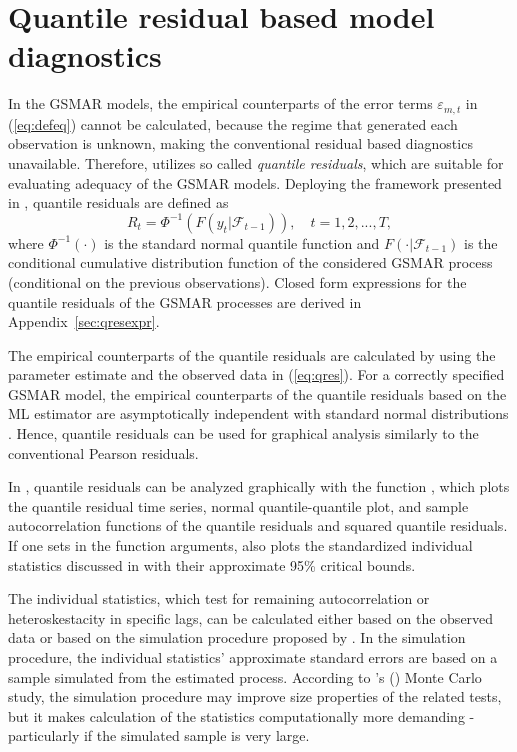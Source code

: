 \documentclass[nojss]{jss} %
\begin{document}
\section{Quantile residual based model diagnostics}\label{sec:qres}

In the GSMAR models, the empirical counterparts of the error terms $\varepsilon_{m,t}$ in (\ref{eq:defeq}) cannot be calculated, because the regime that generated each observation is unknown, making the conventional residual based diagnostics unavailable. Therefore,  utilizes so called \emph{quantile residuals}, which are suitable for evaluating adequacy of the GSMAR models. Deploying the framework presented in \cite{Kalliovirta:2012}, quantile residuals are defined as
%
\begin{equation}\label{eq:qres}
R_t=\Phi^{-1}(F(y_t|\mathcal{F}_{t-1})), \quad t=1,2,...,T,
\end{equation}
%
where $\Phi^{-1}(\cdot)$ is the standard normal quantile function and $F(\cdot|\mathcal{F}_{t-1})$ is the conditional cumulative distribution function of the considered GSMAR process (conditional on the previous observations). Closed form expressions for the quantile residuals of the GSMAR processes are derived in Appendix~\ref{sec:qresexpr}.
%

The empirical counterparts of the quantile residuals are calculated by using the parameter estimate and the observed data in (\ref{eq:qres}). For a correctly specified GSMAR model, the empirical counterparts of the quantile residuals based on the ML estimator are asymptotically independent with standard normal distributions \citep[Lemma 2.1]{Kalliovirta:2012}. Hence, quantile residuals can be used for graphical analysis similarly to the conventional Pearson residuals.

In , quantile residuals can be analyzed graphically with the function , which plots the quantile residual time series, normal quantile-quantile plot, and sample autocorrelation functions of the quantile residuals and squared quantile residuals. If one sets  in the function arguments,  also plots the standardized individual statistics discussed in \citet[pp. 369-370]{Kalliovirta:2012} with their approximate 95\% critical bounds.

The individual statistics, which test for remaining autocorrelation or heteroskestacity in specific lags, can be calculated either based on the observed data or based on the simulation procedure proposed by \cite{Kalliovirta:2012}. In the simulation procedure, the individual statistics' approximate standard errors are based on a sample simulated from the estimated process. According to \citeauthor{Kalliovirta:2012}'s (\citeyear{Kalliovirta:2012}) Monte Carlo study, the simulation procedure may improve size properties of the related tests, but it makes calculation of the statistics computationally more demanding - particularly if the simulated sample is very large.
\end{document}
